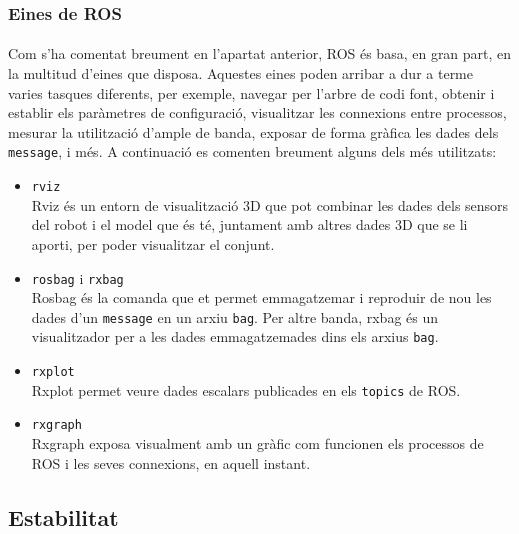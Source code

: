\documentclass[12pt,a4paper,final,twoside]{article}
\begin{document}
\subsubsection{Eines de ROS}
\paragraph{}Com s'ha comentat breument en l'apartat anterior, ROS és basa, en gran part, en la multitud d'eines que disposa. Aquestes eines poden arribar a dur a terme varies tasques diferents, per exemple, navegar per l'arbre de codi font, obtenir i establir els paràmetres de configuració, visualitzar les connexions entre processos, mesurar la utilització d'ample de banda, exposar de forma gràfica les dades dels \texttt{message}, i més. A continuació es comenten breument alguns dels més utilitzats:
\begin{itemize}
\item \texttt{rviz}\\
Rviz és un entorn de visualització 3D que pot combinar les dades dels sensors del robot i el model que és té, juntament amb altres dades 3D que se li aporti, per poder visualitzar el conjunt.

\item \texttt{rosbag} i \texttt{rxbag}\\
Rosbag és la comanda que et permet emmagatzemar i reproduir de nou les dades d'un \texttt{message} en un arxiu \texttt{bag}. Per altre banda, rxbag és un visualitzador per a les dades emmagatzemades dins els arxius \texttt{bag}.

\item \texttt{rxplot}\\
Rxplot permet veure dades escalars publicades en els \texttt{topics} de ROS.

\item \texttt{rxgraph}\\
Rxgraph exposa visualment amb un gràfic com funcionen els processos de ROS i les seves connexions, en aquell instant.

\end{itemize}


\subsection{Estabilitat}
\end{document}
